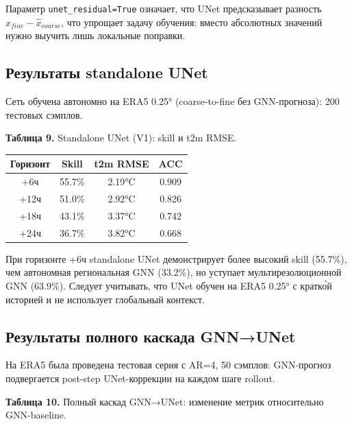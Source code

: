 \documentclass[14pt,a4paper]{extarticle}
\newcounter{none}
\numberwithin{table}{section}
\numberwithin{figure}{section}
\numberwithin{equation}{section}
\begin{document}
Параметр \texttt{unet\_residual=True} означает, что UNet предсказывает
разность \(\hat{x}_{fine} - \hat{x}_{coarse}\), что упрощает задачу
обучения: вместо абсолютных значений нужно выучить лишь локальные
поправки.

\subsection{Результаты standalone UNet}\label{ux440ux435ux437ux443ux43bux44cux442ux430ux442ux44b-standalone-unet}

Сеть обучена автономно на ERA5 0.25° (coarse-to-fine без GNN-прогноза):
200 тестовых сэмплов.

\textbf{Таблица 9.} Standalone UNet (V1): skill и t2m RMSE.

{\def\LTcaptype{none} %
\begin{longtable}[]{@{}cccc@{}}
\toprule\noalign{}
Горизонт & Skill & t2m RMSE & ACC \\
\midrule\noalign{}
\endhead
\bottomrule\noalign{}
\endlastfoot
+6ч & 55.7\% & 2.19°C & 0.909 \\
+12ч & 51.0\% & 2.92°C & 0.826 \\
+18ч & 43.1\% & 3.37°C & 0.742 \\
+24ч & 36.7\% & 3.82°C & 0.668 \\
\end{longtable}
}

При горизонте +6ч standalone UNet демонстрирует более высокий skill
(55.7\%), чем автономная региональная GNN (33.2\%), но уступает
мультирезолюционной GNN (63.9\%). Следует учитывать, что UNet обучен на
ERA5 0.25° с кратко́й историей и не использует глобальный контекст.

\subsection{Результаты полного каскада GNN→UNet}\label{ux440ux435ux437ux443ux43bux44cux442ux430ux442ux44b-ux43fux43eux43bux43dux43eux433ux43e-ux43aux430ux441ux43aux430ux434ux430-gnnunet}

На ERA5 была проведена тестовая серия с AR=4, 50 сэмплов: GNN-прогноз
подвергается post-step UNet-коррекции на каждом шаге rollout.

\textbf{Таблица 10.} Полный каскад GNN→UNet: изменение метрик
относительно GNN-baseline.
\end{document}
